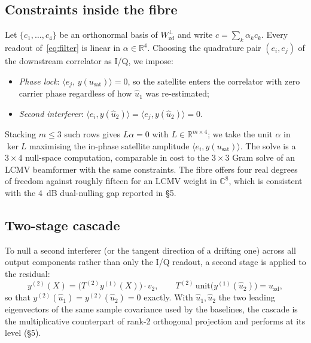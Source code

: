 \subsection{Constraints inside the fibre}\label{sec:fibreconstraints}
Let $\{c_1,\dots,c_4\}$ be an orthonormal basis of $W_{\mathrm{zd}}^\perp$ and write
$c=\sum_k\alpha_kc_k$. Every readout of~\eqref{eq:filter} is linear in
$\alpha\in\mathbb{R}^4$. Choosing the quadrature pair $(e_i,e_j)$ of the downstream
correlator as I/Q, we impose:
\begin{itemize}
\item \emph{Phase lock}: $\langle e_j,\,y(u_{\mathrm{sat}})\rangle=0$, so the satellite enters
the correlator with zero carrier phase regardless of how $\hat u_1$ was re-estimated;
\item \emph{Second interferer}: $\langle e_i,y(\hat u_2)\rangle=\langle e_j,y(\hat u_2)\rangle=0$.
\end{itemize}
Stacking $m\le3$ such rows gives $L\alpha=0$ with $L\in\mathbb{R}^{m\times4}$; we take the unit
$\alpha$ in $\ker L$ maximising the in-phase satellite amplitude
$\langle e_i,y(u_{\mathrm{sat}})\rangle$. The solve is a $3\times4$ null-space computation,
comparable in cost to the $3\times3$ Gram solve of an LCMV beamformer with the same
constraints. The fibre offers four real degrees of freedom against roughly fifteen for an
LCMV weight in $\mathbb{C}^8$, which is consistent with the 4~dB dual-nulling gap reported
in \S5.

\subsection{Two-stage cascade}
To null a second interferer (or the tangent direction of a drifting one) across all output
components rather than only the I/Q readout, a second stage is applied to the residual:
\begin{equation}
y^{(2)}(X)=\bigl(T^{(2)}y^{(1)}(X)\bigr)\cdot v_2,\qquad
T^{(2)}\,\mathrm{unit}\bigl(y^{(1)}(\hat u_2)\bigr)=u_{\mathrm{zd}},
\label{eq:cascade}
\end{equation}
so that $y^{(2)}(\hat u_1)=y^{(2)}(\hat u_2)=0$ exactly. With $\hat u_1,\hat u_2$ the two
leading eigenvectors of the same sample covariance used by the baselines, the cascade is the
multiplicative counterpart of rank-2 orthogonal projection and performs at its level (\S5).

